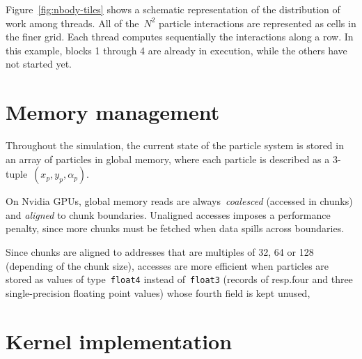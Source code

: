 Figure~\ref{fig:nbody-tiles} shows a schematic representation
of the distribution of work among threads.
All of the~\(N^2\) particle interactions are represented
as cells in the finer grid.
Each thread computes sequentially the interactions
along a row.
In this example, blocks 1 through 4 are already in execution,
while the others have not started yet.

\section{Memory management}
\label{sec:memory-management}

Throughout the simulation,
the current state of the particle system
is stored in an array of particles in global memory,
where each particle is described as a 3-tuple~\((x_p, y_p, α_p)\).

On Nvidia GPUs,
global memory reads are always~\emph{coalesced} (accessed in chunks)
and \emph{aligned} to chunk boundaries.
Unaligned accesses imposes a performance penalty,
since more chunks must be fetched
when data spills across boundaries.

Since chunks are aligned to addresses that are
multiples of 32, 64 or 128 (depending of the chunk size),
accesses are more efficient when particles are stored
as values of type~\texttt{float4} instead of~\texttt{float3}
(records of resp.\@ four and three single-precision floating point values)
whose fourth field is kept unused,


\section{Kernel implementation}
\label{sec:kernel-implementation}


